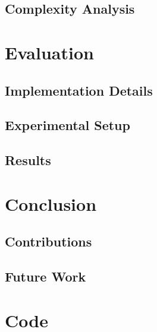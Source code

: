 \documentclass[fyp]{socreport}
\begin{document}
\section{Complexity Analysis}

\chapter{Evaluation}
\section{Implementation Details}
\section{Experimental Setup}
\section{Results}

\chapter{Conclusion}
\section{Contributions}
\section{Future Work}




\appendix
\chapter{Code}
\end{document}
